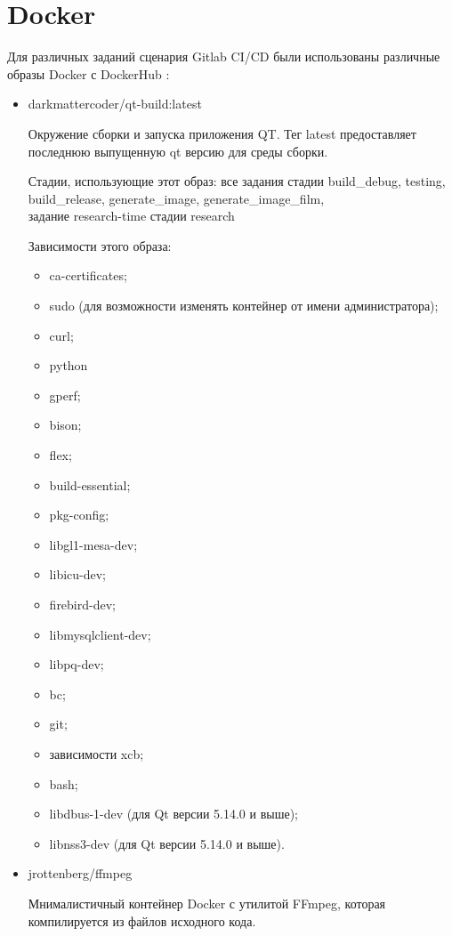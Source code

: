 
\newpage
\section{Docker}
Для различных заданий сценария Gitlab CI/CD были использованы
различные образы Docker с DockerHub \cite{bib3}:
\begin{itemize}
	\item darkmattercoder/qt-build:latest 
	
	Окружение сборки и запуска приложения QT. Тег latest предоставляет последнюю выпущенную qt версию для среды сборки. 
	
	Стадии, использующие этот образ: все задания стадии build\_debug, testing, build\_release, generate\_image, generate\_image\_film, \\задание research-time стадии research
	
	Зависимости этого образа:
	\begin{itemize}
		\item ca-certificates;
		\item sudo (для возможности изменять контейнер от имени администратора);
		\item curl;
		\item python
		\item gperf;
		\item bison;
		\item flex;
		\item build-essential;
		\item pkg-config;
		\item libgl1-mesa-dev;
		\item libicu-dev;
		\item firebird-dev;
		\item libmysqlclient-dev;
		\item libpq-dev;
		\item bc;
		\item git;
		\item зависимости xcb;
		\item bash;
		\item libdbus-1-dev (для Qt версии 5.14.0 и выше);
		\item libnss3-dev (для Qt версии 5.14.0 и выше).
	\end{itemize}
	\item jrottenberg/ffmpeg
	
	Мнималистичный контейнер Docker с утилитой FFmpeg, которая компилируется из файлов исходного кода. 
	

\end{itemize}
